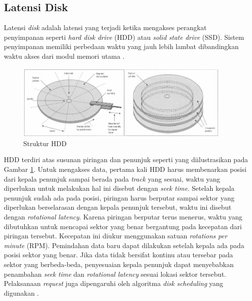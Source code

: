 \subsection{Latensi Disk}
\label{sec:latensi-disk}

Latensi \textit{disk} adalah latensi yang terjadi ketika mengakses perangkat penyimpanan seperti \textit{hard disk drive} (HDD) atau \textit{solid state drive} (SSD). Sistem penyimpanan memiliki perbedaan waktu yang jauh lebih lambat dibandingkan waktu akses dari modul memori utama \parencite{ng1991improving}.

\begin{figure}[ht]
	\centering
	\includegraphics[width=0.95\textwidth]{resources/chapter-2/disk-structure.png}
	\caption{Struktur HDD \parencite{sammes2000disk}}
	\label{fig:hdd-structure}
\end{figure}

HDD terdiri atas susunan piringan dan penunjuk seperti yang diilustrasikan pada Gambar \ref{fig:hdd-structure}. Untuk mengakses data, pertama kali HDD harus membenarkan posisi dari kepala penunjuk sampai berada pada \textit{track} yang sesuai, waktu yang diperlukan untuk melakukan hal ini disebut dengan \textit{seek time}. Setelah kepala penunjuk sudah ada pada posisi, piringan harus berputar sampai sektor yang diperlukan berselarasan dengan kepala penunjuk tersebut, waktu ini disebut dengan \textit{rotational latency}. Karena piringan berputar terus menerus, waktu yang dibutuhkan untuk mencapai sektor yang benar bergantung pada kecepatan dari piringan tersebut. Kecepatan ini diukur menggunakan satuan \textit{rotations per minute} (RPM). Pemindahan data baru dapat dilakukan setelah kepala ada pada posisi sektor yang benar. Jika data tidak bersifat kontinu atau tersebar pada sektor yang berbeda-beda, penyesuaian kepala penunjuk dapat menyebabkan penambahan \textit{seek time} dan \textit{rotational latency} sesuai lokasi sektor tersebut. Pelaksanaan \textit{request} juga dipengaruhi oleh algoritma \textit{disk scheduling} yang digunakan \parencite{arpaci2018operating}.

